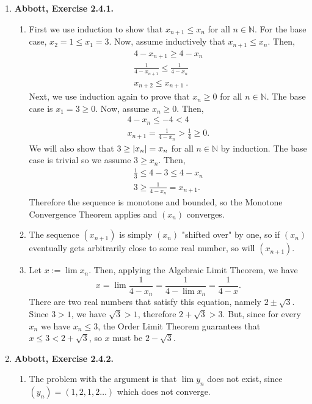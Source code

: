 \documentclass{article}
\DeclarePairedDelimiter\abs{\lvert}{\rvert}
\newcommand{\N}{\mathbb{N}}
\newcommand{\exc}[2][Abbott]{\item \textbf{#1, Exercise #2.}}
\begin{document}
\begin{enumerate}
    \exc{2.4.1}
    \begin{enumerate}
    	\item First we use induction to show that $x_{n+1} \leq x_n$ for all $n \in \N$. For the base case, $x_2 = 1 \leq x_1 = 3$. Now, assume inductively that $x_{n+1} \leq x_n$. Then, \begin{gather*}
    	      4-x_{n+1} \geq 4-x_n \\ 
    	      \frac{1}{4-x_{n+1}} \leq \frac{1}{4-x_n} \\ 
    	      x_{n+2} \leq x_{n+1} ~ .
    	\end{gather*}
    	Next, we use induction again to prove that $x_n \geq 0$ for all $n \in \N$. The base case is $x_1 = 3 \geq 0$. Now, assume $x_n \geq 0$. Then, \begin{gather*}
    	4-x_n \leq - 4 < 4 \\ 
    	x_{n+1} = \frac{1}{4-x_n} > \frac{1}{4} \geq 0.
    	\end{gather*} We will also show that $3 \geq \abs*{x_n} = x_n$ for all $n \in \N$ by induction. The base case is trivial so we assume $3 \geq x_n$. Then, \begin{gather*}
    	\frac{1}{3} \leq 4-3 \leq 4-x_n \\
    	3 \geq \frac{1}{4-x_n} = x_{n+1}.
    	\end{gather*} Therefore the sequence is monotone and bounded, so the Monotone Convergence Theorem applies and $(x_n)$ converges.
    		    	
    	\item The sequence $(x_{n+1})$ is simply $(x_n)$ "shifted over" by one, so if $(x_n)$ eventually gets arbitrarily close to some real number, so will $(x_{n+1})$.
    	
    	\item Let $x := \lim x_n$. Then, applying the Algebraic Limit Theorem, we have \begin{equation*}
    	    x = \lim \frac{1}{4-x_n} = \frac{1}{4-\lim x_n} = \frac{1}{4-x}.
    	\end{equation*} There are two real numbers that satisfy this equation, namely $2 \pm \sqrt{3}$. Since $3 > 1$, we have $\sqrt{3} > 1$, therefore $2 + \sqrt{3} > 3$. But, since for every $x_n$ we have $x_n \leq 3$, the Order Limit Theorem guarantees that $x \leq 3 < 2 + \sqrt{3}$, so $x$ must be $2 - \sqrt{3}$. 
    \end{enumerate} 
    
    \exc{2.4.2} 
    \begin{enumerate}
        \item  The problem with the argument is that $\lim y_n$ does not exist, since $(y_n) = (1,2,1,2 \dots)$ which does not converge.
        

\end{enumerate}
\end{enumerate}
\end{document}
